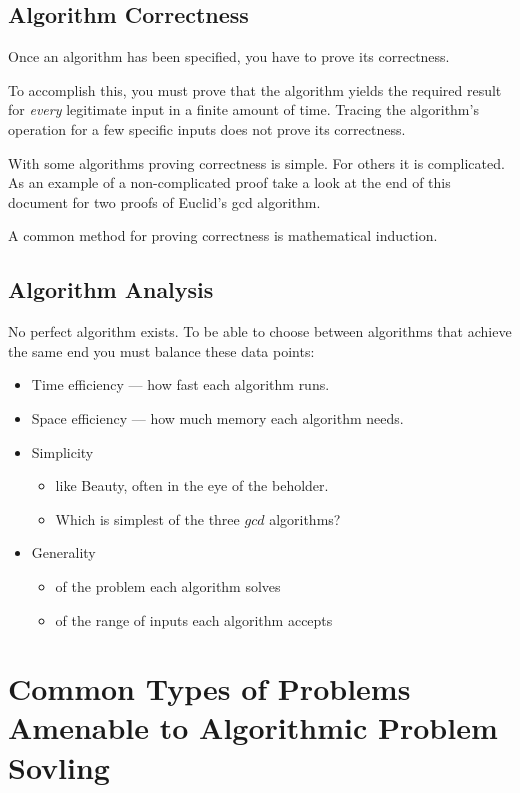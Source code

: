 \documentclass[12pt]{amsart}
\begin{document}
  
\subsection{Algorithm Correctness}

   Once an algorithm has been specified, you have to prove its correctness.

   To accomplish this, you must prove that the algorithm yields the required result for
   \textit{every} legitimate input in a finite amount of time. Tracing the algorithm's operation for a few specific inputs does not prove its correctness. 
   
   With some algorithms proving correctness is simple. For others it is complicated. As an example of a non-complicated proof take a look at the end of this document for two proofs of Euclid's gcd algorithm.

   A common method for proving correctness is mathematical induction.
   
   \subsection{Algorithm Analysis}
No perfect algorithm exists. To be able to choose between algorithms that achieve the same end you must balance these data points:
\begin{itemize}
\item Time efficiency --- how fast each algorithm runs.
\item Space efficiency --- how much memory each algorithm needs.
\item Simplicity
\begin{itemize}
  \item like Beauty, often in the eye of the beholder.
  \item Which is simplest of the three $gcd$ algorithms?
\end{itemize}
\item Generality
\begin{itemize} 
  \item of the problem each algorithm solves
  \item of the range of inputs each algorithm accepts
\end{itemize}
\end{itemize}
\section{Common Types of Problems Amenable to Algorithmic Problem Sovling}
\end{document}

